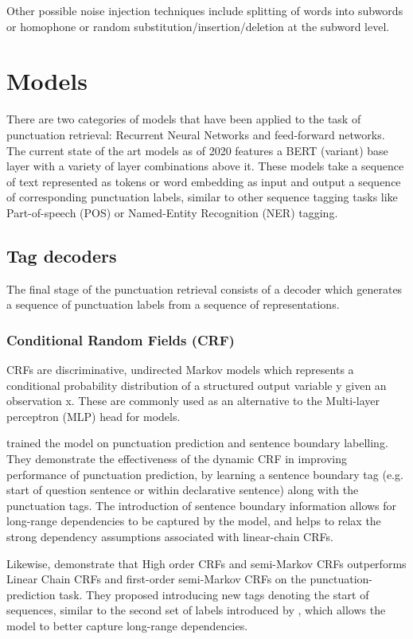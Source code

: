 \documentclass[a4paper]{article}
\begin{document}
\begin{multicols}{2}
Other possible noise injection techniques include splitting of words into subwords or homophone or random substitution/insertion/deletion at the subword level.

\section{Models}
There are two categories of models that have been applied to the task of punctuation retrieval: Recurrent Neural Networks and feed-forward networks.
The current state of the art models as of 2020 features a BERT (variant) base layer with a variety of layer combinations above it. These models take a sequence of text represented as tokens or word embedding as input and output a sequence of corresponding punctuation labels, similar to other sequence tagging tasks like Part-of-speech (POS) or Named-Entity Recognition (NER) tagging.
\subsection{Tag decoders}
The final stage of the punctuation retrieval consists of a decoder which generates a sequence of punctuation labels from a sequence of representations.
\subsubsection{Conditional Random Fields (CRF)}
CRFs \citep{crf} are discriminative, undirected
Markov models which represents a conditional probability distribution of a structured output
variable y given an observation x. These are commonly used as an alternative to the Multi-layer perceptron (MLP) head for models. 

\cite{dynamiccrf} trained the model on punctuation prediction and sentence boundary labelling. They demonstrate the effectiveness of the dynamic CRF in improving performance of punctuation prediction, by learning a sentence boundary tag (e.g. start of question sentence or within declarative sentence) along with the punctuation tags. The introduction of sentence boundary information allows for long-range dependencies to be captured by the model, and helps to relax the strong dependency assumptions associated with linear-chain CRFs.

Likewise, \cite{crfhighorderdependencies} demonstrate that High order CRFs and semi-Markov CRFs outperforms Linear Chain CRFs and first-order semi-Markov CRFs on the punctuation-prediction task. They proposed introducing new tags denoting the start of sequences, similar to the second set of labels introduced by \citet{dynamiccrf}, which allows the model to better capture long-range dependencies.


\end{multicols}
\end{document}
